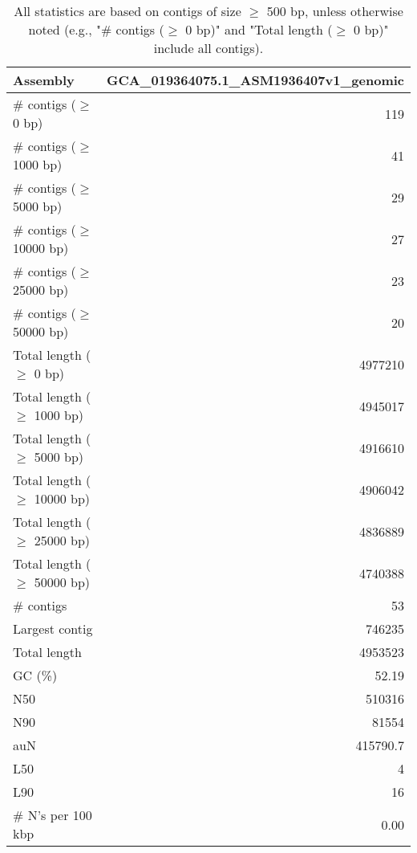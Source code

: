 \documentclass[12pt,a4paper]{article}
\begin{document}
\begin{table}[ht]
\begin{center}
\caption{All statistics are based on contigs of size $\geq$ 500 bp, unless otherwise noted (e.g., "\# contigs ($\geq$ 0 bp)" and "Total length ($\geq$ 0 bp)" include all contigs).}
\begin{tabular}{|l*{1}{|r}|}
\hline
Assembly & GCA\_019364075.1\_ASM1936407v1\_genomic \\ \hline
\# contigs ($\geq$ 0 bp) & 119 \\ \hline
\# contigs ($\geq$ 1000 bp) & 41 \\ \hline
\# contigs ($\geq$ 5000 bp) & 29 \\ \hline
\# contigs ($\geq$ 10000 bp) & 27 \\ \hline
\# contigs ($\geq$ 25000 bp) & 23 \\ \hline
\# contigs ($\geq$ 50000 bp) & 20 \\ \hline
Total length ($\geq$ 0 bp) & 4977210 \\ \hline
Total length ($\geq$ 1000 bp) & 4945017 \\ \hline
Total length ($\geq$ 5000 bp) & 4916610 \\ \hline
Total length ($\geq$ 10000 bp) & 4906042 \\ \hline
Total length ($\geq$ 25000 bp) & 4836889 \\ \hline
Total length ($\geq$ 50000 bp) & 4740388 \\ \hline
\# contigs & 53 \\ \hline
Largest contig & 746235 \\ \hline
Total length & 4953523 \\ \hline
GC (\%) & 52.19 \\ \hline
N50 & 510316 \\ \hline
N90 & 81554 \\ \hline
auN & 415790.7 \\ \hline
L50 & 4 \\ \hline
L90 & 16 \\ \hline
\# N's per 100 kbp & 0.00 \\ \hline
\end{tabular}
\end{center}
\end{table}
\end{document}
